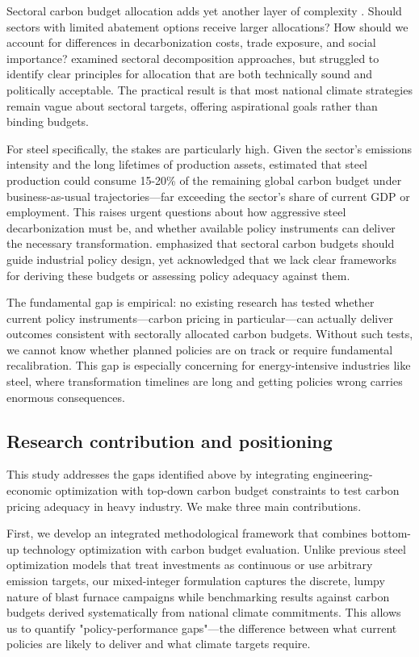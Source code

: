 Sectoral carbon budget allocation adds yet another layer of complexity \citep{gasser2018negative}. Should sectors with limited abatement options receive larger allocations? How should we account for differences in decarbonization costs, trade exposure, and social importance? \citet{kuramochi2018beyond} examined sectoral decomposition approaches, but struggled to identify clear principles for allocation that are both technically sound and politically acceptable. The practical result is that most national climate strategies remain vague about sectoral targets, offering aspirational goals rather than binding budgets.

For steel specifically, the stakes are particularly high. Given the sector's emissions intensity and the long lifetimes of production assets, \citet{bataille2018role} estimated that steel production could consume 15-20\% of the remaining global carbon budget under business-as-usual trajectories—far exceeding the sector's share of current GDP or employment. This raises urgent questions about how aggressive steel decarbonization must be, and whether available policy instruments can deliver the necessary transformation. \citet{Griffin2020} emphasized that sectoral carbon budgets should guide industrial policy design, yet acknowledged that we lack clear frameworks for deriving these budgets or assessing policy adequacy against them.

The fundamental gap is empirical: no existing research has tested whether current policy instruments—carbon pricing in particular—can actually deliver outcomes consistent with sectorally allocated carbon budgets. Without such tests, we cannot know whether planned policies are on track or require fundamental recalibration. This gap is especially concerning for energy-intensive industries like steel, where transformation timelines are long and getting policies wrong carries enormous consequences.

\subsection{Research contribution and positioning}

This study addresses the gaps identified above by integrating engineering-economic optimization with top-down carbon budget constraints to test carbon pricing adequacy in heavy industry. We make three main contributions.

First, we develop an integrated methodological framework that combines bottom-up technology optimization with carbon budget evaluation. Unlike previous steel optimization models that treat investments as continuous or use arbitrary emission targets, our mixed-integer formulation captures the discrete, lumpy nature of blast furnace campaigns while benchmarking results against carbon budgets derived systematically from national climate commitments. This allows us to quantify "policy-performance gaps"—the difference between what current policies are likely to deliver and what climate targets require.

